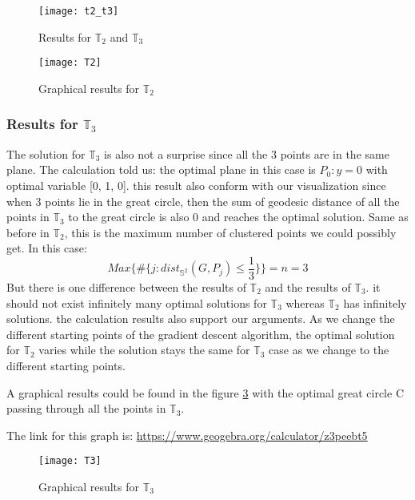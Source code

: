 \documentclass[12pt]{article}
\numberwithin{equation}{section}
\let\bb\mathbb
\let\bb\mathbb
\begin{document}
		\begin{figure}[b]
			\centering
			\texttt{[image: t2\_t3]}
			\caption{Results for $\bb{T}_2$ and $\bb{T}_3$}
			\label{fig:c3}
		\end{figure}

		\begin{figure}
			\centering
			\texttt{[image: T2]}
			\caption{Graphical results for $\bb{T}_2$ }
			\label{fig:g2}
		\end{figure}
		
		\subsubsection{Results for $\bb{T}_3$}
			The solution for $\bb{T}_3$ is also not a surprise since all the 3 points are in the same plane. The calculation told us: the optimal plane in this case is $P_0: y=0$ with optimal variable [0, 1, 0]. this result also conform with our visualization since when 3 points lie in the great circle, then the sum of geodesic distance of all the points in $\bb{T}_3$ to the great circle is also 0 and reaches the optimal solution. Same as before in $\bb{T}_2$, this is the maximum number of clustered points we could possibly get. In this case:
			\[ Max \{\#  \{ j:dist_{{\bb{S}}^2} (G, P_j)\leq \dfrac{1}{3} \}\} = n = 3\]
			But there is one difference between the results of $\bb{T}_2$ and the results of $\bb{T}_3$. it should not exist infinitely many optimal solutions for $\bb{T}_3$ whereas $\bb{T}_2$ has infinitely solutions. the calculation results also support our arguments. As we change the different starting points of the gradient descent algorithm, the optimal solution for $\bb{T}_2$ varies while the solution stays the same for $\bb{T}_3$ case as we change to the different starting points.\par 
			A graphical results could be found in the figure \ref{fig:g3} with the optimal great circle C passing through all the points in $\bb{T}_3$. \par 
			The link for this graph is: 
			\url{https://www.geogebra.org/calculator/z3peebt5}
			
			
		\begin{figure}
			\centering
			\texttt{[image: T3]}
			\caption{Graphical results for $\bb{T}_3$ }
			\label{fig:g3}
		\end{figure}
		
\end{document}
